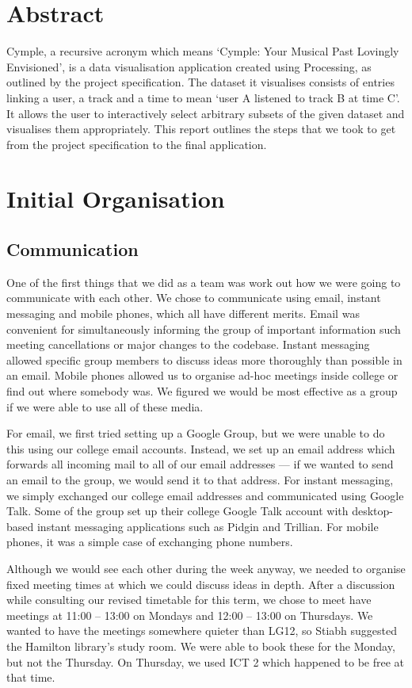\section{Abstract}
Cymple, a recursive acronym which means `Cymple: Your Musical Past Lovingly Envisioned', is a data visualisation application created using Processing, as outlined by the project specification.\cite{specification} The dataset it visualises consists of entries linking a user, a track and a time to mean `user A listened to track B at time C'. It allows the user to interactively select arbitrary subsets of the given dataset and visualises them appropriately. This report outlines the steps that we took to get from the project specification to the final application.

\section{Initial Organisation}
\subsection{Communication}
One of the first things that we did as a team was work out how we were going to communicate with each other. We chose to communicate using email, instant messaging and mobile phones, which all have different merits. Email was convenient for simultaneously informing the group of important information such meeting cancellations or major changes to the codebase. Instant messaging allowed specific group members to discuss ideas more thoroughly than possible in an email. Mobile phones allowed us to organise ad-hoc meetings inside college or find out where somebody was. We figured we would be most effective as a group if we were able to use all of these media.

For email, we first tried setting up a Google Group, but we were unable to do this using our college email accounts. Instead, we set up an email address which forwards all incoming mail to all of our email addresses --- if we wanted to send an email to the group, we would send it to that address. For instant messaging, we simply exchanged our college email addresses and communicated using Google Talk. Some of the group set up their college Google Talk account with desktop-based instant messaging applications such as Pidgin and Trillian. For mobile phones, it was a simple case of exchanging phone numbers.

Although we would see each other during the week anyway, we needed to organise fixed meeting times at which we could discuss ideas in depth. After a discussion while consulting our revised timetable for this term, we chose to meet have meetings at 11:00 -- 13:00 on Mondays and 12:00 -- 13:00 on Thursdays. We wanted to have the meetings somewhere quieter than LG12, so Stiabh suggested the Hamilton library's study room. We were able to book these for the Monday, but not the Thursday. On Thursday, we used ICT 2 which happened to be free at that time.

